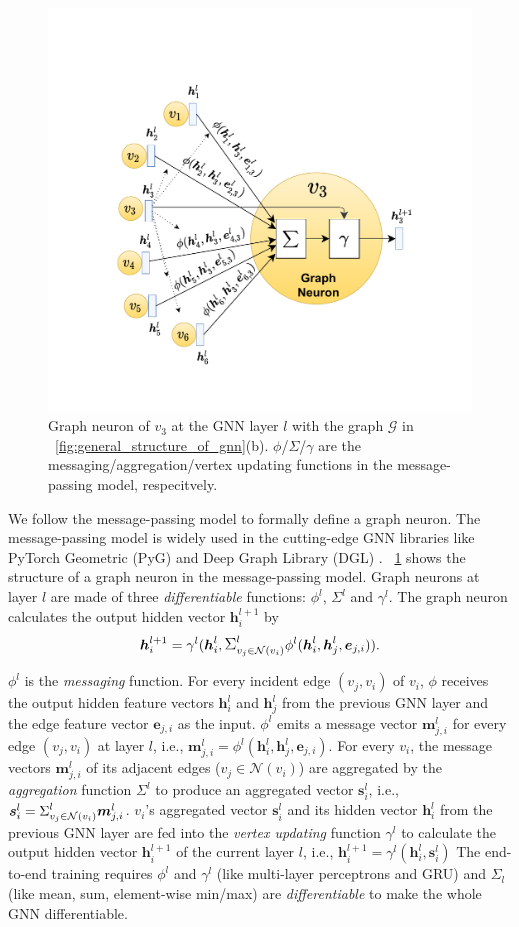 \begin{figure}
    \centering
    \includegraphics[width=0.5\columnwidth]{figs/illustration/GNN_Unit.pdf}
    \caption{Graph neuron of $v_3$ at the GNN layer $l$ with the graph $\mathcal{G}$ in \figurename~\ref{fig:general_structure_of_gnn}(b). $\phi$/$\Sigma$/$\gamma$ are the messaging/aggregation/vertex updating functions in the message-passing model, respecitvely.}
    \label{fig:graph_neuron_structure}
\end{figure}

We follow the message-passing model \cite{gilmer_messgae_passing} to formally define a graph neuron.
The message-passing model is widely used in the cutting-edge GNN libraries like PyTorch Geometric (PyG) \cite{PyG} and Deep Graph Library (DGL) \cite{DGL}.
\figurename~\ref{fig:graph_neuron_structure} shows the structure of a graph neuron in the message-passing model.
Graph neurons at layer $l$ are made of three \emph{differentiable} functions: $\phi^l$, $\Sigma^l$ and $\gamma^l$.
The graph neuron calculates the output hidden vector $\boldsymbol{h}^{l+1}_i$ by
$$
    \boldsymbol{h}^{l+1}_i = \gamma^l(\boldsymbol{h}^l_i, \mathlarger{\Sigma}^l_{v_j \in \mathcal{N}(v_i)}{\phi^l(\boldsymbol{h}^l_i, \boldsymbol{h}^l_j,   \boldsymbol{e}_{j,i})}).
$$

$\phi^l$ is the \emph{messaging} function.
For every incident edge $(v_j, v_i)$ of $v_i$, $\phi$ receives the output hidden feature vectors $\boldsymbol{h}^l_i$ and $\boldsymbol{h}^l_j$ from the previous GNN layer and the edge feature vector $\boldsymbol{e}_{j,i}$ as the input.
$\phi^l$ emits a message vector $\boldsymbol{m}^l_{j,i}$ for every edge $(v_j, v_i)$ at layer $l$, i.e., $\boldsymbol{m}^l_{j,i}=\phi^l(\boldsymbol{h}^l_i, \boldsymbol{h}^l_j, \boldsymbol{e}_{j,i})$.
For every $v_i$, the message vectors $\boldsymbol{m}^l_{j,i}$ of its adjacent edges ($v_j \in \mathcal{N}(v_i)$) are aggregated by the \emph{aggregation} function $\Sigma^l$ to produce an aggregated vector $\boldsymbol{s}^l_i$, i.e., $\boldsymbol{s}^l_i=\mathlarger{\Sigma}^l_{v_j \in \mathcal{N}(v_i)}\boldsymbol{m}^l_{j,i}$.
$v_i$'s aggregated vector $\boldsymbol{s}^l_i$ and its hidden vector $\boldsymbol{h}^l_i$ from the previous GNN layer are fed into the \emph{vertex updating} function $\gamma^l$ to calculate the output hidden vector $\boldsymbol{h}^{l+1}_i$ of the current layer $l$, i.e., $\boldsymbol{h}^{l+1}_i = \gamma^l(\boldsymbol{h}^l_i, \boldsymbol{s}^l_i)$
The end-to-end training requires $\phi^l$ and $\gamma^l$ (like multi-layer perceptrons and GRU) and $\Sigma_l$ (like mean, sum, element-wise min/max) are \emph{differentiable} to make the whole GNN differentiable.

